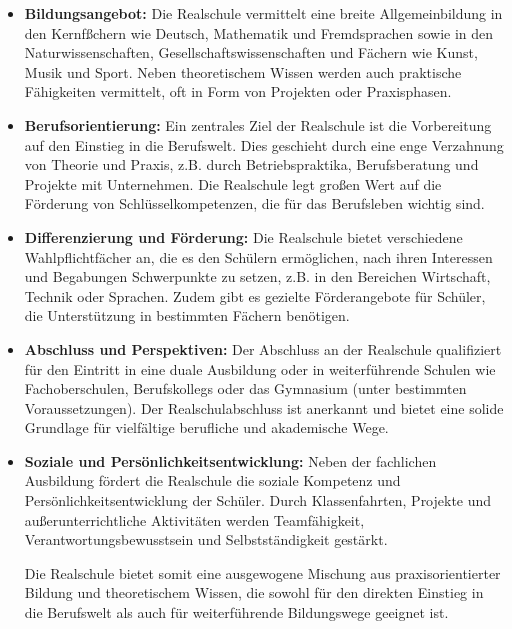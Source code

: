 \begin{itemize}
	
	\item \textbf{Bildungsangebot:} Die Realschule vermittelt eine breite Allgemeinbildung in den Kernf{\ss}chern wie Deutsch, Mathematik und Fremdsprachen sowie in den Naturwissenschaften, Gesellschaftswissenschaften und F\"{a}chern wie Kunst, Musik und Sport. Neben theoretischem Wissen werden auch praktische F\"{a}higkeiten vermittelt, oft in Form von Projekten oder Praxisphasen.
	
	\item \textbf{Berufsorientierung:} Ein zentrales Ziel der Realschule ist die Vorbereitung auf den Einstieg in die Berufswelt. Dies geschieht durch eine enge Verzahnung von Theorie und Praxis, z.B. durch Betriebspraktika, Berufsberatung und Projekte mit Unternehmen. Die Realschule legt gro{\ss}en Wert auf die F\"{o}rderung von Schl\"{u}sselkompetenzen, die f\"{u}r das Berufsleben wichtig sind.
	
	\item \textbf{Differenzierung und F\"{o}rderung:} Die Realschule bietet verschiedene Wahlpflichtf\"{a}cher an, die es den Sch\"{u}lern erm\"{o}glichen, nach ihren Interessen und Begabungen Schwerpunkte zu setzen, z.B. in den Bereichen Wirtschaft, Technik oder Sprachen. Zudem gibt es gezielte F\"{o}rderangebote f\"{u}r Sch\"{u}ler, die Unterst\"{u}tzung in bestimmten F\"{a}chern ben\"{o}tigen.
	
	\item \textbf{Abschluss und Perspektiven:} Der Abschluss an der Realschule qualifiziert f\"{u}r den Eintritt in eine duale Ausbildung oder in weiterf\"{u}hrende Schulen wie Fachoberschulen, Berufskollegs oder das Gymnasium (unter bestimmten Voraussetzungen). Der Realschulabschluss ist anerkannt und bietet eine solide Grundlage f\"{u}r vielf\"{a}ltige berufliche und akademische Wege.
	
	\item \textbf{Soziale und Pers\"{o}nlichkeitsentwicklung:} Neben der fachlichen Ausbildung f\"{o}rdert die Realschule die soziale Kompetenz und Pers\"{o}nlichkeitsentwicklung der Sch\"{u}ler. Durch Klassenfahrten, Projekte und au{\ss}erunterrichtliche Aktivit\"{a}ten werden Teamf\"{a}higkeit, Verantwortungsbewusstsein und Selbstst\"{a}ndigkeit gest\"{a}rkt.
	
	Die Realschule bietet somit eine ausgewogene Mischung aus praxisorientierter Bildung und theoretischem Wissen, die sowohl f\"{u}r den direkten Einstieg in die Berufswelt als auch f\"{u}r weiterf\"{u}hrende Bildungswege geeignet ist.
\end{itemize}

